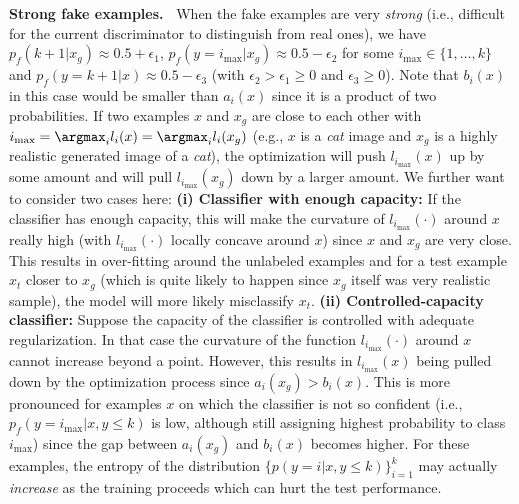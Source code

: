 \documentclass{article}
\begin{document}
{\bf Strong fake examples.~} When the fake examples are very \emph{strong} (i.e., difficult for the current discriminator to distinguish from real ones), we have $p_f(k+1|x_g)\approx 0.5+\epsilon_1$, $p_f(y=i_\text{max}|x_g)\approx 0.5-\epsilon_2$ for some $i_\text{max}\in \{1,\ldots,k\}$ and $p_f(y=k+1|x)\approx 0.5-\epsilon_3$ (with $\epsilon_2 > \epsilon_1\geq 0$ and $\epsilon_3\geq 0$). Note that $b_i(x)$ in this case would be smaller than $a_i(x)$ since it is a product of two probabilities. If two examples $x$ and $x_g$ are close to each other with $i_\text{max} = \argmax_i l_i(x) = \argmax_i l_i(x_g)$ (e.g., $x$ is a \emph{cat} image and $x_g$ is a highly realistic generated image of a \emph{cat}), the optimization will push $l_{i_\text{max}}(x)$ up by some amount and will pull $l_{i_\text{max}}(x_g)$ down by a larger amount. We further want to consider two cases here: {\bf (i) Classifier with enough capacity:} If the classifier has enough capacity, this will make the curvature of $l_{i_\text{max}}(\cdot)$ around $x$ really high (with $l_{i_\text{max}}(\cdot)$ locally concave around $x$) since $x$ and $x_g$ are very close. This results in over-fitting around the unlabeled examples and for a test example $x_t$ closer to $x_g$ (which is quite likely to happen since $x_g$ itself was very realistic sample), the model will more likely misclassify $x_t$. 
{\bf (ii) Controlled-capacity classifier: } Suppose the capacity of the classifier is controlled with adequate regularization. In that case the curvature of the function $l_{i_\text{max}}(\cdot)$ around $x$ cannot increase beyond a point. However, this results in $l_{i_\text{max}}(x)$ being pulled down by the optimization process since $a_i(x_g) > b_i(x)$. This is more pronounced for examples $x$ on which the classifier is not so confident (i.e., $p_f(y=i_\text{max}|x,y\leq k)$ is low, although still assigning highest probability to class $i_\text{max}$) since the gap between $a_i(x_g)$ and $b_i(x)$ becomes higher. For these examples, the entropy of the distribution $\{p(y=i|x,y\leq k)\}_{i=1}^k$ may actually \emph{increase} as the training proceeds which can hurt the test performance. 
\end{document}
